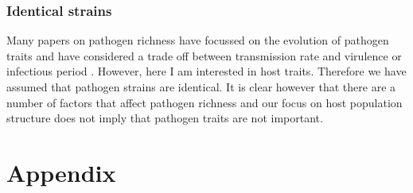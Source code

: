 \subsubsection{Identical strains}

Many papers on pathogen richness have focussed on the evolution of pathogen traits and have considered a trade off between transmission rate and virulence \cite{nowak1994superinfection, nowak1994superinfection} or infectious period \cite{poletto2013host}.
However, here I am interested in host traits.
Therefore we have assumed that pathogen strains are identical.
It is clear however that there are a number of factors that affect pathogen richness and our focus on host population structure does not imply that pathogen traits are not important.




\clearpage
\section{Appendix}


